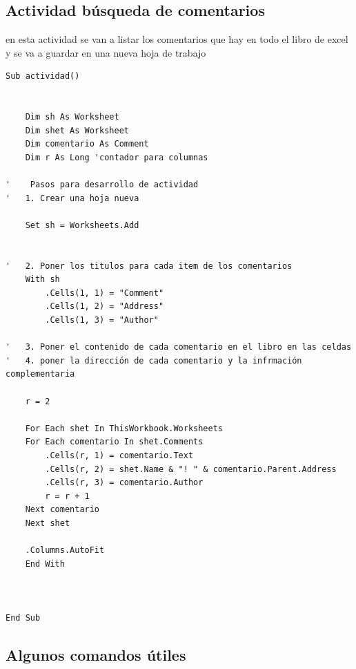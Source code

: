 \subsection{Actividad búsqueda de comentarios}

en esta actividad se van a listar los comentarios que hay en todo el libro de excel y se va a guardar en una nueva hoja de trabajo


\begin{verbatim}
Sub actividad()


    Dim sh As Worksheet
    Dim shet As Worksheet
    Dim comentario As Comment
    Dim r As Long 'contador para columnas

'    Pasos para desarrollo de actividad
'   1. Crear una hoja nueva

    Set sh = Worksheets.Add
    

'   2. Poner los titulos para cada item de los comentarios
    With sh
        .Cells(1, 1) = "Comment"
        .Cells(1, 2) = "Address"
        .Cells(1, 3) = "Author"
    
'   3. Poner el contenido de cada comentario en el libro en las celdas
'   4. poner la dirección de cada comentario y la infrmación complementaria

    r = 2
    
    For Each shet In ThisWorkbook.Worksheets
    For Each comentario In shet.Comments
        .Cells(r, 1) = comentario.Text
        .Cells(r, 2) = shet.Name & "! " & comentario.Parent.Address
        .Cells(r, 3) = comentario.Author
        r = r + 1
    Next comentario
    Next shet
    
    .Columns.AutoFit
    End With



End Sub

\end{verbatim}

\subsection{Algunos comandos útiles}

